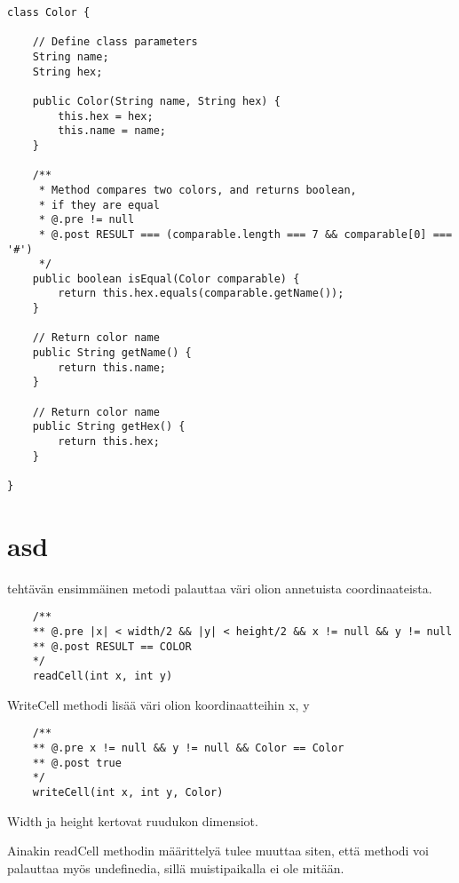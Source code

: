 \documentclass[a4paper,12pt,titlepage]{article}
\theoremstyle{definition}
\theoremstyle{remark}
\begin{document}
\begin{lstlisting}
class Color {

    // Define class parameters
    String name;
    String hex;

    public Color(String name, String hex) {
        this.hex = hex;
        this.name = name;
    }

    /**
     * Method compares two colors, and returns boolean,
     * if they are equal
     * @.pre != null
     * @.post RESULT === (comparable.length === 7 && comparable[0] === '#')
     */
    public boolean isEqual(Color comparable) {
        return this.hex.equals(comparable.getName());
    }

    // Return color name
    public String getName() {
        return this.name;
    }

    // Return color name
    public String getHex() {
        return this.hex;
    }

}

\end{lstlisting}

\newpage

\section{asd}
tehtävän ensimmäinen metodi palauttaa väri olion annetuista coordinaateista.

\begin{lstlisting}
    /**
    ** @.pre |x| < width/2 && |y| < height/2 && x != null && y != null
    ** @.post RESULT == COLOR
    */
    readCell(int x, int y)
\end{lstlisting}

WriteCell methodi lisää väri olion koordinaatteihin x, y

\begin{lstlisting}
    /**
    ** @.pre x != null && y != null && Color == Color
    ** @.post true
    */
    writeCell(int x, int y, Color)
\end{lstlisting}

Width ja height kertovat ruudukon dimensiot.

Ainakin readCell methodin määrittelyä tulee muuttaa siten, että methodi voi palauttaa myös undefinedia, sillä muistipaikalla ei ole mitään.
\end{document}
